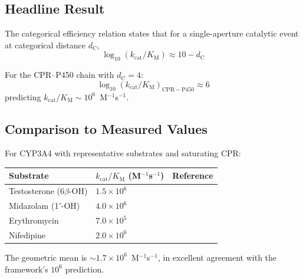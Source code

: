 \documentclass[11pt,twocolumn,a4paper]{article}
\theoremstyle{definition}
\theoremstyle{remark}
\newcommand{\dC}{d_{\mathrm{C}}}
\newcommand{\kcat}{k_{\mathrm{cat}}}
\newcommand{\KM}{K_{\mathrm{M}}}
\begin{document}
\subsection{Headline Result}

The categorical efficiency relation \citep{sachikonye2025_landscape}
states that for a single-aperture catalytic event at categorical
distance $\dC$,
\begin{equation}
\log_{10}(\kcat/\KM) \approx 10 - \dC
\label{eq:efficiency}
\end{equation}

For the CPR--P450 chain with $\dC = 4$:
\begin{equation}
\boxed{\log_{10}(\kcat/\KM)_{\mathrm{CPR-P450}} \approx 6}
\label{eq:dc4_prediction}
\end{equation}
predicting $\kcat/\KM \sim 10^6$~M$^{-1}$s$^{-1}$.

\subsection{Comparison to Measured Values}

For CYP3A4 with representative substrates and saturating CPR:
\begin{center}
\small
\begin{tabular}{llr}
\toprule
Substrate & $\kcat/\KM$ (M$^{-1}$s$^{-1}$) & Reference \\
\midrule
Testosterone (6$\beta$-OH) & $1.5 \times 10^6$ & \citep{shou1999} \\
Midazolam (1$'$-OH) & $4.0 \times 10^6$ & \citep{galetin2005} \\
Erythromycin & $7.0 \times 10^5$ & \citep{shou1999} \\
Nifedipine & $2.0 \times 10^6$ & \citep{shou1999} \\
\bottomrule
\end{tabular}
\end{center}

The geometric mean is $\sim 1.7 \times 10^6$~M$^{-1}$s$^{-1}$, in
excellent agreement with the framework's $10^6$ prediction.
\end{document}
